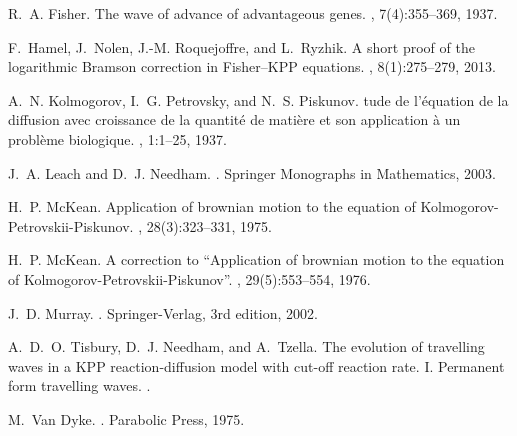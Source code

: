 \documentclass[11pt,a4paper]{article}
\begin{document}
\begin{thebibliography}{10}
R.~A. Fisher.
\newblock The wave of advance of advantageous genes.
, 7(4):355--369, 1937.

F.~Hamel, J.~Nolen, J.-M. Roquejoffre, and L.~Ryzhik.
\newblock A short proof of the logarithmic {B}ramson correction in
  {F}isher--{K}{P}{P} equations.
, 8(1):275--279, 2013.

A.~N. Kolmogorov, I.~G. Petrovsky, and N.~S. Piskunov.
tude de l'{\'{e}}quation de la diffusion avec croissance de la
  quantit{\'{e}} de mati{\`{e}}re et son application {\`{a}} un probl{\`{e}}me
  biologique.
, 1:1--25, 1937.

J.~A. Leach and D.~J. Needham.
.
\newblock Springer Monographs in Mathematics, 2003.

H.~P. McKean.
\newblock Application of brownian motion to the equation of
  {K}olmogorov-{P}etrovskii-{P}iskunov.
, 28(3):323--331, 1975.

H.~P. McKean.
\newblock A correction to ``{A}pplication of brownian motion to the equation of
  {K}olmogorov-{P}etrovskii-{P}iskunov''.
, 29(5):553--554, 1976.

J.~D. Murray.
.
\newblock Springer-Verlag, 3rd edition, 2002.

A.~D.~O. Tisbury, D.~J. Needham, and A.~Tzella.
\newblock The evolution of travelling waves in a {KPP} reaction-diffusion model
  with cut-off reaction rate. {I}. {P}ermanent form travelling waves.
.

M.~{Van Dyke}.
.
\newblock Parabolic Press, 1975.

\end{thebibliography}
\end{document}

